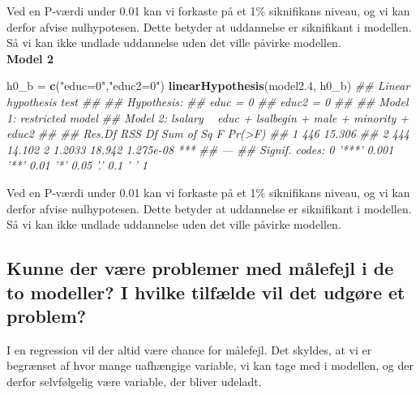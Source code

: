 \documentclass[
  10pt,
]{article}
\newenvironment{Shaded}{\begin{snugshade}}{\end{snugshade}}
\newcommand{\CommentTok}[1]{\textcolor[rgb]{0.56,0.35,0.01}{\textit{#1}}}
\newcommand{\FloatTok}[1]{\textcolor[rgb]{0.00,0.00,0.81}{#1}}
\newcommand{\KeywordTok}[1]{\textcolor[rgb]{0.13,0.29,0.53}{\textbf{#1}}}
\newcommand{\NormalTok}[1]{#1}
\newcommand{\StringTok}[1]{\textcolor[rgb]{0.31,0.60,0.02}{#1}}
\begin{document}
Ved en P-værdi under 0.01 kan vi forkaste på et 1\% siknifikans niveau,
og vi kan derfor afvise nulhypotesen. Dette betyder at uddannelse er
siknifikant i modellen. Så vi kan ikke undlade uddannelse uden det ville
påvirke modellen.\\
\textbf{Model 2}

\begin{Shaded}
\begin{Highlighting}[]
\NormalTok{h0_b =}\StringTok{ }\KeywordTok{c}\NormalTok{(}\StringTok{"educ=0"}\NormalTok{,}\StringTok{"educ2=0"}\NormalTok{)}
\KeywordTok{linearHypothesis}\NormalTok{(model2}\FloatTok{.4}\NormalTok{, h0_b)}
\CommentTok{## Linear hypothesis test}
\CommentTok{## }
\CommentTok{## Hypothesis:}
\CommentTok{## educ = 0}
\CommentTok{## educ2 = 0}
\CommentTok{## }
\CommentTok{## Model 1: restricted model}
\CommentTok{## Model 2: lsalary ~ educ + lsalbegin + male + minority + educ2}
\CommentTok{## }
\CommentTok{##   Res.Df    RSS Df Sum of Sq      F    Pr(>F)    }
\CommentTok{## 1    446 15.306                                  }
\CommentTok{## 2    444 14.102  2    1.2033 18.942 1.275e-08 ***}
\CommentTok{## ---}
\CommentTok{## Signif. codes:  0 '***' 0.001 '**' 0.01 '*' 0.05 '.' 0.1 ' ' 1}
\end{Highlighting}
\end{Shaded}

Ved en P-værdi under 0.01 kan vi forkaste på et 1\% siknifikans niveau,
og vi kan derfor afvise nulhypotesen. Dette betyder at uddannelse er
siknifikant i modellen. Så vi kan ikke undlade uddannelse uden det ville
påvirke modellen.\\

\hypertarget{kunne-der-vuxe6re-problemer-med-muxe5lefejl-i-de-to-modeller-i-hvilke-tilfuxe6lde-vil-det-udguxf8re-et-problem}{%
\subsection{Kunne der være problemer med målefejl i de to modeller? I
hvilke tilfælde vil det udgøre et
problem?}\label{kunne-der-vuxe6re-problemer-med-muxe5lefejl-i-de-to-modeller-i-hvilke-tilfuxe6lde-vil-det-udguxf8re-et-problem}}

\leavevmode

I en regression vil der altid være chance for målefejl. Det skyldes, at
vi er begrænset af hvor mange uafhængige variable, vi kan tage med i
modellen, og der derfor selvfølgelig være variable, der bliver
udeladt.\\
\end{document}

